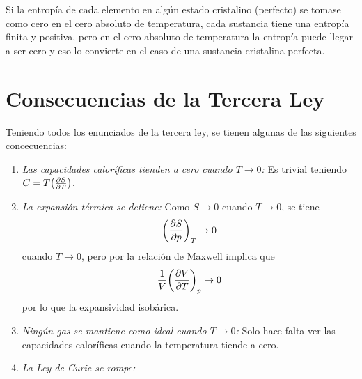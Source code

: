 Si la entropía de cada elemento en algún estado cristalino (perfecto) se tomase como cero en el cero absoluto de temperatura, cada sustancia tiene una entropía finita y positiva, pero en el cero absoluto de temperatura la entropía puede llegar a ser cero y eso lo convierte en el caso de una sustancia cristalina perfecta.


\section{Consecuencias de la Tercera Ley}
Teniendo todos los enunciados de la tercera ley, se tienen algunas de las siguientes concecuencias:

\begin{enumerate}
	\item \textit{Las capacidades caloríficas tienden a cero cuando $T\to 0$: } Es trivial teniendo $C = T\qty(\pdv{S}{T})$.
	\item \textit{La expansión térmica se detiene: } Como $S\to 0$ cuando $T\to 0$, se tiene
		$$ \qty(\pdv{S}{p})_T \to 0 $$
		cuando $T\to 0$, pero por la relación de Maxwell implica que
			$$ \frac{1}{V} \qty(\pdv{V}{T})_p \to 0 $$
		por lo que la expansividad isobárica.
	\item \textit{Ningún gas se mantiene como ideal cuando $T\to 0$: } Solo hace falta ver las capacidades caloríficas cuando la temperatura tiende a cero.
	\item \textit{La Ley de Curie se rompe: } 
\end{enumerate}











































